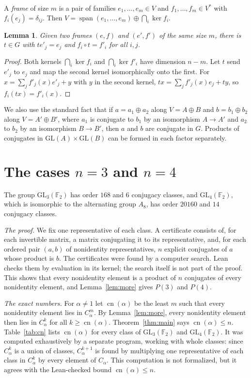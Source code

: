 \documentclass[11pt]{amsart}
\newtheorem{lemma}[theorem]{Lemma}
\theoremstyle{definition}
\theoremstyle{remark}
\newcommand{\F}{\mathbb{F}_2}
\newcommand{\GL}{\mathrm{GL}}
\newcommand{\Span}{\operatorname{span}}
\newcommand{\cn}{\operatorname{cn}}
\begin{document}
A \emph{frame} of size $m$ is a pair of families $e_1,\dots,e_m\in V$ and
$f_1,\dots,f_m\in V^*$ with $f_i(e_j)=\delta_{ij}$. Then
$V=\Span(e_1,\dots,e_m)\oplus\bigcap_i\ker f_i$.

\begin{lemma}\label{lem:frame}
Given two frames $(e,f)$ and $(e',f')$ of the same size $m$, there is $t\in G$ with $te'_j=e_j$
and $f_i\circ t=f'_i$ for all $i,j$.
\end{lemma}

\begin{proof}
Both kernels $\bigcap_i\ker f_i$ and $\bigcap_i\ker f'_i$ have dimension $n-m$. Let $t$ send
$e'_j$ to $e_j$ and map the second kernel isomorphically onto the first. For
$x=\sum_j f'_j(x)e'_j+y$ with $y$ in the second kernel, $tx=\sum_j f'_j(x)e_j+ty$, so
$f_i(tx)=f'_i(x)$.
\end{proof}

We also use the standard fact that if $a=a_1\oplus a_2$ along $V=A\oplus B$ and
$b=b_1\oplus b_2$ along $V=A'\oplus B'$, where $a_1$ is conjugate to $b_1$ by an isomorphism
$A\to A'$ and $a_2$ to $b_2$ by an isomorphism $B\to B'$, then $a$ and $b$ are conjugate in $G$.
Products of conjugates in $\GL(A)\times\GL(B)$ can be formed in each factor separately.

\section{The cases \texorpdfstring{$n=3$}{n=3} and \texorpdfstring{$n=4$}{n=4}}\label{sec:small}

The group $\GL_3(\F)$ has order $168$ and $6$ conjugacy classes, and $\GL_4(\F)$, which is
isomorphic to the alternating group $A_8$, has order $20160$ and $14$ conjugacy classes.

\emph{The proof.} We fix one representative of each class. A certificate consists of, for each
invertible matrix, a matrix conjugating it to its representative, and, for each ordered pair
$(a,b)$ of nonidentity representatives, $n$ explicit conjugates of $a$ whose product is $b$. The
certificates were found by a computer search. Lean checks them by evaluation in its kernel; the
search itself is not part of the proof. This shows that every nonidentity element is a product of
$n$ conjugates of every nonidentity element, and Lemma~\ref{lem:more} gives $P(3)$ and $P(4)$.

\emph{The exact numbers.} For $\alpha\ne1$ let $\cn(\alpha)$ be the least $m$ such that every
nonidentity element lies in $C_\alpha^m$. By Lemma~\ref{lem:more}, every nonidentity element then
lies in $C_\alpha^k$ for all $k\ge\cn(\alpha)$. Theorem~\ref{thm:main} says $\cn(\alpha)\le n$.
Table~\ref{tab:cn} lists $\cn(\alpha)$ for every class of $\GL_3(\F)$ and $\GL_4(\F)$. It was
computed exhaustively by a separate program, working with whole classes: since $C_\alpha^k$ is a
union of classes, $C_\alpha^{k+1}$ is found by multiplying one representative of each class in
$C_\alpha^k$ by every element of $C_\alpha$. This computation is not formalized, but it agrees
with the Lean-checked bound $\cn(\alpha)\le n$.
\end{document}
